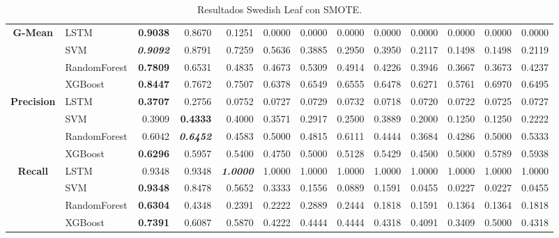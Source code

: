 \begin{table}[H]
\begin{adjustbox}{max width=14cm}
\begin{tabular}{|c|l|r|r|r|r|r|r|r|r|r|r|r|}
		\hline
		\textbf{G-Mean} &  LSTM & \textbf{  0.9038 } &  0.8670 &  0.1251 &  0.0000 &  0.0000 &  0.0000 &  0.0000 &  0.0000 &  0.0000 &  0.0000 &  0.0000 \\
		&  SVM & \textit{ \textbf{  0.9092 } } &  0.8791 &  0.7259 &  0.5636 &  0.3885 &  0.2950 &  0.3950 &  0.2117 &  0.1498 &  0.1498 &  0.2119 \\
		&  RandomForest & \textbf{  0.7809 } &  0.6531 &  0.4835 &  0.4673 &  0.5309 &  0.4914 &  0.4226 &  0.3946 &  0.3667 &  0.3673 &  0.4237 \\
		&  XGBoost & \textbf{  0.8447 } &  0.7672 &  0.7507 &  0.6378 &  0.6549 &  0.6555 &  0.6478 &  0.6271 &  0.5761 &  0.6970 &  0.6495 \\
		\hline
		\textbf{Precision} &  LSTM & \textbf{  0.3707 } &  0.2756 &  0.0752 &  0.0727 &  0.0729 &  0.0732 &  0.0718 &  0.0720 &  0.0722 &  0.0725 &  0.0727 \\
		&  SVM &  0.3909 & \textbf{  0.4333 } &  0.4000 &  0.3571 &  0.2917 &  0.2500 &  0.3889 &  0.2000 &  0.1250 &  0.1250 &  0.2222 \\
		&  RandomForest &  0.6042 & \textit{ \textbf{  0.6452 } } &  0.4583 &  0.5000 &  0.4815 &  0.6111 &  0.4444 &  0.3684 &  0.4286 &  0.5000 &  0.5333 \\
		&  XGBoost & \textbf{  0.6296 } &  0.5957 &  0.5400 &  0.4750 &  0.5000 &  0.5128 &  0.5429 &  0.4500 &  0.5000 &  0.5789 &  0.5938 \\
		\hline
		\textbf{Recall} &  LSTM &  0.9348 &  0.9348 & \textit{ \textbf{  1.0000 } } &  1.0000 &  1.0000 &  1.0000 &  1.0000 &  1.0000 &  1.0000 &  1.0000 &  1.0000 \\
		&  SVM & \textbf{  0.9348 } &  0.8478 &  0.5652 &  0.3333 &  0.1556 &  0.0889 &  0.1591 &  0.0455 &  0.0227 &  0.0227 &  0.0455 \\
		&  RandomForest & \textbf{  0.6304 } &  0.4348 &  0.2391 &  0.2222 &  0.2889 &  0.2444 &  0.1818 &  0.1591 &  0.1364 &  0.1364 &  0.1818 \\
		&  XGBoost & \textbf{  0.7391 } &  0.6087 &  0.5870 &  0.4222 &  0.4444 &  0.4444 &  0.4318 &  0.4091 &  0.3409 &  0.5000 &  0.4318 \\
		\hline
	\end{tabular}
\end{adjustbox}
\caption{Resultados Swedish Leaf con SMOTE.}
\label{tab:SLeaf_SMOTE}
\end{table}

